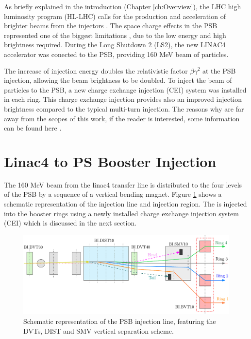 \pagestyle{fancy}

\graphicspath{ {Figures/Chapter9_H0Hm/} }

As briefly explained in the introduction (Chapter \ref{ch:Overview}), the LHC high luminosity program (HL-LHC) \parencite[][]{ref:HL-LHC} calls for the production and acceleration of brighter beams from the injectors \parencite[][]{ref:InjectorsUpgrade}. The space charge effects in the PSB represented one of the biggest limitations \parencite[][]{ref:ChargeEffect}, due to the low energy and high brightness required. During the Long Shutdown 2 (LS2), the new LINAC4 accelerator was conected to the PSB, providing 160 MeV \hm beam of particles. 

The increase of injection energy doubles the relativistic factor $\beta \gamma^2$ at the PSB injection, allowing the beam brightness to be doubled. To inject the \hm beam of particles to the PSB, a new charge exchange injection (CEI) system \parencite[][]{ref:ChargeExchange} was installed in each ring. This charge exchange injection provides also an improved injection brightness compared to the typical multi-turn injection. The reasons why are far away from the scopes of this work, if the reader is interested, some information can be found here \parencite[][]{ref:liuvilleviolation}.

\section{Linac4 to PS Booster Injection}

The 160 MeV beam from the linac4 transfer line is distributed to the four levels of the PSB by a sequence of a vertical bending magnet. Figure \ref{fig:Injection} shows a schematic representation of the injection line and injection region. The is injected into the booster rings using a newly installed charge exchange injection system (CEI) which is discussed in the next section.

\begin{figure}[h]
    \centering
    \includegraphics[width=0.9\columnwidth]{Figure_DistributorBeam/InjecLayout.pdf}
    \caption{Schematic representation of the PSB injection line, featuring the DVTs, DIST and SMV vertical separation scheme. }
    \label{fig:Injection}
\end{figure}

